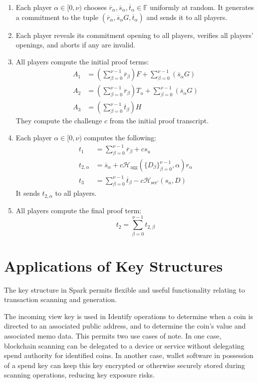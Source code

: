 \documentclass{llncs}
\newcommand{\F}{\mathbb{F}}
\newcommand{\hash}{\mathcal{H}}
\begin{document}
\begin{enumerate}
\item Each player $\alpha \in [0,\nu)$ chooses $\overline{r}_\alpha, \overline{s}_\alpha, \overline{t}_\alpha \in \F$ uniformly at random.
It generates a commitment to the tuple $(\overline{r}_\alpha, \overline{s}_\alpha G, \overline{t}_\alpha)$ and sends it to all players.
\item Each player reveals its commitment opening to all players, verifies all players' openings, and aborts if any are invalid.
\item All players compute the initial proof terms:
\begin{align*}
A_1 &= \left( \sum_{\beta=0}^{\nu-1} \overline{r}_\beta \right) F + \sum_{\beta=0}^{\nu-1} (\overline{s}_\alpha G) \\
A_2 &= \left( \sum_{\beta=0}^{\nu-1} \overline{r}_\beta \right) T_u + \sum_{\beta=0}^{\nu-1} (\overline{s}_\alpha G) \\
A_3 &= \left( \sum_{\beta=0}^{\nu-1} \overline{t}_\beta \right) H
\end{align*}
They compute the challenge $c$ from the initial proof transcript.
\item Each player $\alpha \in [0,\nu)$ computes the following:
\begin{align*}
t_1 &= \sum_{\beta=0}^{\nu-1} \overline{r}_\beta + cs_u \\
t_{2,\alpha} &= \overline{s}_\alpha + c\hash_{\text{agg}}\left( \{D_\beta\}_{\beta=0}^{\nu-1}, \alpha \right) r_\alpha \\
t_3 &= \sum_{\beta=0}^{\nu-1} \overline{t}_\beta - c\hash_{\text{ser}'}(s_u, D)
\end{align*}
It sends $t_{2,\alpha}$ to all players.
\item All players compute the final proof term: $$t_2 = \sum_{\beta=0}^{\nu-1} t_{2,\beta}$$
\end{enumerate}


\section{Applications of Key Structures}

The key structure in Spark permits flexible and useful functionality relating to transaction scanning and generation.

The incoming view key is used in $\text{Identify}$ operations to determine when a coin is directed to an associated public address, and to determine the coin's value and associated memo data.
This permits two use cases of note.
In one case, blockchain scanning can be delegated to a device or service without delegating spend authority for identified coins.
In another case, wallet software in possession of a spend key can keep this key encrypted or otherwise securely stored during scanning operations, reducing key exposure risks.
\end{document}
